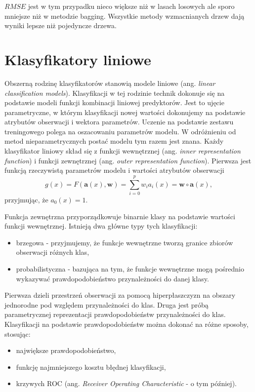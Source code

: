 \documentclass[
]{book}
\providecommand{\tightlist}{%
  \setlength{\itemsep}{0pt}\setlength{\parskip}{0pt}}
\theoremstyle{plain}
\theoremstyle{definition}
\theoremstyle{definition}
\theoremstyle{definition}
\theoremstyle{definition}
\theoremstyle{remark}
\begin{document}
\(RMSE\) jest w tym przypadku nieco większe niż w lasach losowych ale sporo mniejsze niż w metodzie bagging. Wszystkie metody wzmacnianych drzew dają wyniki lepsze niż pojedyncze drzewa.

\hypertarget{klasyfikatory-liniowe}{%
\chapter{Klasyfikatory liniowe}\label{klasyfikatory-liniowe}}

Obszerną rodzinę klasyfikatorów stanowią modele liniowe (ang. \emph{linear classification models}). Klasyfikacji w tej rodzinie technik dokonuje się na podstawie modeli funkcji kombinacji liniowej predyktorów. Jest to ujęcie parametryczne, w którym klasyfikacji nowej wartości dokonujemy na podstawie atrybutów obserwacji i wektora parametrów. Uczenie na podstawie zestawu treningowego polega na oszacowaniu parametrów modelu. W odróżnieniu od metod nieparametrycznych postać modelu tym razem jest znana. Każdy klasyfikator liniowy skład się z funkcji wewnętrznej (ang. \emph{inner representation function}) i funkcji zewnętrznej (ang. \emph{outer representation function}).
Pierwsza jest funkcją rzeczywistą parametrów modelu i wartości atrybutów obserwacji
\begin{equation}
    g(x) = F(\mathbf{a}(x),\mathbf{w})=\sum_{i=0}^pw_ia_i(x)=\mathbf{w}\circ \mathbf{a}(x),
\end{equation}
przyjmując, że \(a_0(x)=1\).

Funkcja zewnętrzna przyporządkowuje binarnie klasy na podstawie wartości funkcji wewnętrznej. Istnieją dwa główne typy tych klasyfikacji:

\begin{itemize}
\tightlist
\item
  brzegowa - przyjmujemy, że funkcje wewnętrzne tworzą granice zbiorów obserwacji różnych klas,
\item
  probabilistyczna - bazująca na tym, że funkcje wewnętrzne mogą pośrednio wykazywać prawdopodobieństwo przynależności do danej klasy.
\end{itemize}

Pierwsza dzieli przestrzeń obserwacji za pomocą hiperpłaszczyzn na obszary jednorodne pod względem przynależności do klas. Druga jest próbą parametrycznej reprezentacji prawdopodobieństw przynależności do klas. Klasyfikacji na podstawie prawdopodobieństw można dokonać na różne sposoby, stosując:

\begin{itemize}
\tightlist
\item
  największe prawdopodobieństwo,
\item
  funkcję najmniejszego kosztu błędnej klasyfikacji,
\item
  krzywych ROC (ang. \emph{Receiver Operating Characteristic} - o tym później).
\end{itemize}
\end{document}
